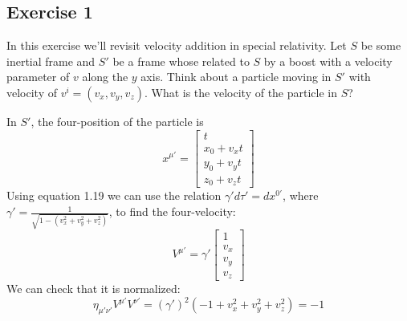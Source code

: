 \subsection{Exercise 1}
In this exercise we'll revisit velocity addition in special relativity. Let $S$ be some inertial frame and $S'$ be a frame whose related to $S$ by a boost with a velocity parameter of $v$ along the $y$ axis.  Think about a particle moving in $S'$ with velocity of $v^i=(v_x,v_y,v_z)$. What is the velocity of the particle in $S$?

In $S'$, the four-position of the particle is
\begin{equation}
    x^{\mu'} = \begin{bmatrix}
        t \\
        x_0 + v_x t \\
        y_0 + v_y t \\
        z_0 + v_z t
    \end{bmatrix}
\end{equation}
Using equation 1.19 we can use the relation $\gamma' d\tau' = dx^{0'}$, where $\gamma'=\frac{1}{\sqrt{1-(v_x^2+v_y^2+v_z^2)}}$, to find the four-velocity:
\begin{equation}
    V^{\mu'} = \gamma' \begin{bmatrix}
        1 \\ v_x \\ v_y \\ v_z
    \end{bmatrix}
\end{equation}
We can check that it is normalized:
\begin{equation}
    \eta_{\mu'\nu'} V^{\mu'}V^{\nu'} = (\gamma')^2 (-1 + v_x^2 +v_y^2+v_z^2) = -1
\end{equation}

